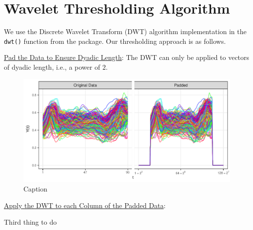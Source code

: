 \section{Wavelet Thresholding Algorithm}

We use the Discrete Wavelet Transform (DWT) algorithm implementation in the \texttt{dwt()} function from the   package.
Our thresholding approach is as follows.

\begin{steps}
  \item \underline{Pad the Data to Ensure Dyadic Length}: The DWT can only be applied to vectors of dyadic length, i.e., a power of $2$.
  \begin{figure}[H]
      \centering
      \includegraphics[width=0.5\linewidth]{figures/DTI-padded.pdf}
      \caption{Caption}
      \label{fig:enter-label}
  \end{figure}
  \item \underline{Apply the DWT to each Column of the Padded Data}:
  \item Third thing to do
\end{steps}
